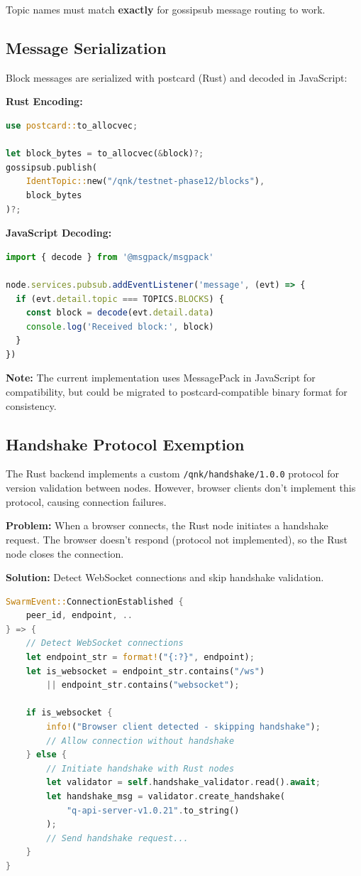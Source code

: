 \documentclass[11pt,a4paper]{article}
\begin{document}
Topic names must match \textbf{exactly} for gossipsub message routing to work.

\subsection{Message Serialization}

Block messages are serialized with postcard (Rust) and decoded in JavaScript:

\textbf{Rust Encoding:}
\begin{lstlisting}[language=Rust]
use postcard::to_allocvec;

let block_bytes = to_allocvec(&block)?;
gossipsub.publish(
    IdentTopic::new("/qnk/testnet-phase12/blocks"),
    block_bytes
)?;
\end{lstlisting}

\textbf{JavaScript Decoding:}
\begin{lstlisting}[language=JavaScript]
import { decode } from '@msgpack/msgpack'

node.services.pubsub.addEventListener('message', (evt) => {
  if (evt.detail.topic === TOPICS.BLOCKS) {
    const block = decode(evt.detail.data)
    console.log('Received block:', block)
  }
})
\end{lstlisting}

\textbf{Note:} The current implementation uses MessagePack in JavaScript for compatibility, but could be migrated to postcard-compatible binary format for consistency.

\subsection{Handshake Protocol Exemption}

The Rust backend implements a custom \texttt{/qnk/handshake/1.0.0} protocol for version validation between nodes. However, browser clients don't implement this protocol, causing connection failures.

\textbf{Problem:} When a browser connects, the Rust node initiates a handshake request. The browser doesn't respond (protocol not implemented), so the Rust node closes the connection.

\textbf{Solution:} Detect WebSocket connections and skip handshake validation.

\begin{lstlisting}[language=Rust, caption=WebSocket Detection and Handshake Exemption]
SwarmEvent::ConnectionEstablished {
    peer_id, endpoint, ..
} => {
    // Detect WebSocket connections
    let endpoint_str = format!("{:?}", endpoint);
    let is_websocket = endpoint_str.contains("/ws")
        || endpoint_str.contains("websocket");

    if is_websocket {
        info!("Browser client detected - skipping handshake");
        // Allow connection without handshake
    } else {
        // Initiate handshake with Rust nodes
        let validator = self.handshake_validator.read().await;
        let handshake_msg = validator.create_handshake(
            "q-api-server-v1.0.21".to_string()
        );
        // Send handshake request...
    }
}
\end{lstlisting}
\end{document}
